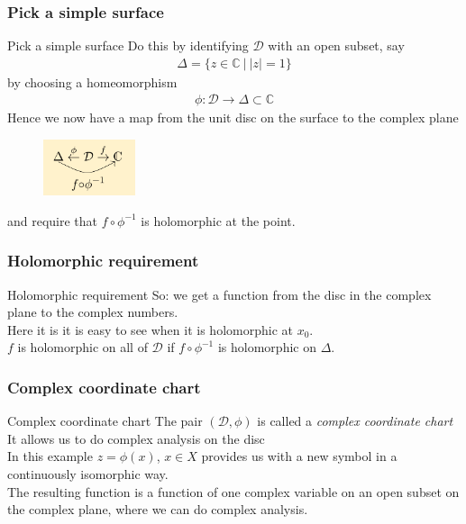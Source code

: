 \documentclass{beamer}[10]
\begin{document}
\begin{frame}
	\frametitle{Pick a simple surface}
	\begin{block}{Pick a simple surface}
			Do this by identifying $\mathcal{D}$ with an open subset, say
			\begin{equation}
				\begin{aligned}
					\Delta = \{z\in \mathds{C}~\big|~|z|=1\}
				\end{aligned}
			\end{equation}
		by choosing a homeomorphism 
		\begin{equation}
			\begin{aligned}
				\phi:\mathcal{D}\to \Delta \subset \mathds{C}
			\end{aligned}
		\end{equation}
	Hence we now have a map from the unit disc on the surface to the complex plane
\begin{figure}\vspace*{-0.3cm}
	\includegraphics[width=2.7cm]{3}
\end{figure}
and require that $f\circ \phi^{-1}$ is holomorphic at the point.
	\end{block}
\end{frame}

\begin{frame}
	\frametitle{Holomorphic requirement}
	\begin{block}{Holomorphic requirement}
	So: we get a function from the disc in the complex plane to the complex numbers.\\
	\vspace*{0.5cm}
	Here it is it is easy to see when it is holomorphic at $x_0$.\\
		\vspace*{0.5cm}
	 $f$ is holomorphic on all of $\mathcal{D}$ if $f\circ \phi^{-1}$ is holomorphic on $\Delta$.\\
	\end{block}
\end{frame}

\begin{frame}
	\frametitle{Complex coordinate chart}
	\begin{block}{Complex coordinate chart}
	The pair $(\mathcal{D},\phi)$ is called a \textit{complex coordinate chart}\\
	\vspace*{0.5cm}
	It allows us to do complex analysis on the disc\\
	\vspace*{0.5cm}
	In this example $z=\phi(x)$, $x\in X$ provides us with a new symbol in a continuously isomorphic way.\\
	\vspace*{0.5cm}
	The resulting function is a function of one complex variable on an open subset on the complex plane, where we can do complex analysis.
	\end{block}
\end{frame}
\end{document}
